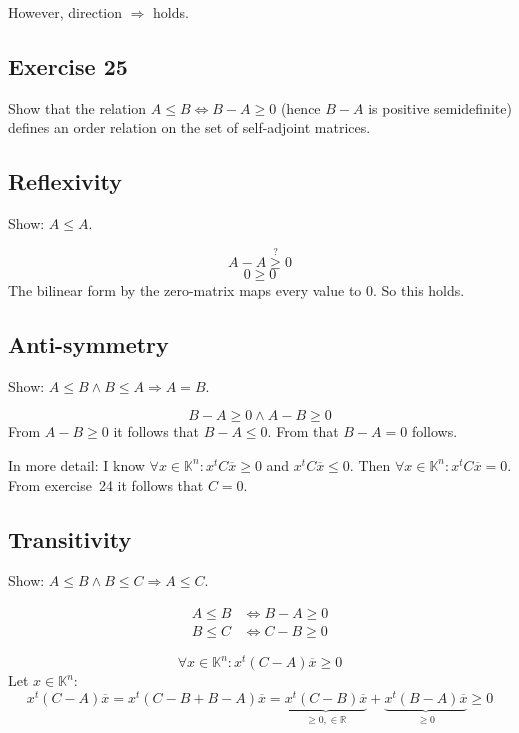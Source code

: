 \documentclass[a4paper]{article}
\theoremstyle{definition}
\begin{document}
However, direction $\Rightarrow$ holds.

\subsection{Exercise 25}
\begin{ex}
  Show that the relation $A \leq B \Leftrightarrow B - A \geq 0$ (hence $B - A$
  is positive semidefinite) defines an order relation on the set of self-adjoint matrices.
\end{ex}

\subsection{Reflexivity}
Show: $A \leq A$.

\[ A - A \stackrel{?}{\geq} 0 \]
\[ 0 \geq 0 \]
The bilinear form by the zero-matrix maps every value to $0$.
So this holds.

\subsection{Anti-symmetry}
Show: $A \leq B \land B \leq A \Rightarrow A = B$.

\[ B - A \geq 0 \land A - B \geq 0 \]
From $A - B \geq 0$ it follows that $B - A \leq 0$. From that $B - A = 0$ follows.

In more detail:
I know $\forall x \in \mathbb K^n: x^t C \overline{x} \geq 0$ and $x^t C \overline{x} \leq 0$.
Then $\forall x \in \mathbb K^n: x^t C \overline{x} = 0$. From exercise~24 it follows that
$C = 0$.

\subsection{Transitivity}
Show: $A \leq B \land B \leq C \Rightarrow A \leq C$.

\begin{align*}
  A \leq B &\Leftrightarrow B - A \geq 0 \\
  B \leq C &\Leftrightarrow C - B \geq 0
\end{align*}

\[ \forall x \in \mathbb K^n: x^t (C - A) \overline{x} \geq 0 \]
Let $x \in \mathbb K^n$:
\[ x^t (C - A) \overline{x} = x^t (C - B + B - A) \overline{x} = \underbrace{x^t (C - B) \overline{x}}_{\geq 0, \in \mathbb R} + \underbrace{x^t (B - A) \overline{x}}_{\geq 0} \geq 0 \]
\end{document}
